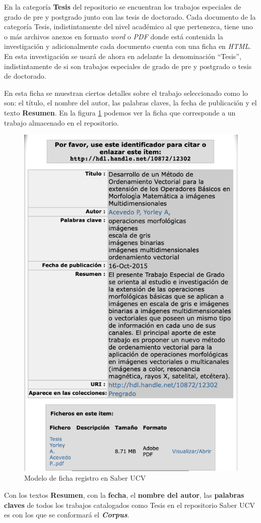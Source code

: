 \documentclass[
  10,
  spanish,
  openany]{book}
\begin{document}
En la categoría \textbf{Tesis} del repositorio se encuentran los trabajos especiales de grado de pre y postgrado junto con las tesis de doctorado. Cada documento de la categoría Tesis, indistintamente del nivel académico al que pertenezca, tiene uno o más archivos anexos en formato \emph{word} o \emph{PDF} donde está contenida la investigación y adicionalmente cada documento cuenta con una ficha en \emph{HTML}. En esta investigación se usará de ahora en adelante la denominación ``Tesis'', indistintamente de si son trabajos especiales de grado de pre y postgrado o tesis de doctorado.

En esta ficha se muestran ciertos detalles sobre el trabajo seleccionado como lo son: el título, el nombre del autor, las palabras claves, la fecha de publicación y el texto \textbf{Resumen}. En la figura \ref{fig:ficharegistro} podemos ver la ficha que corresponde a un trabajo almacenado en el repositorio.

\begin{figure}

{\centering \includegraphics[width=0.6\linewidth]{images/01-intro/ficha_registro} 

}

\caption{Modelo de ficha registro en Saber UCV}\label{fig:ficharegistro}
\end{figure}

Con los textos \textbf{Resumen}, con la \textbf{fecha}, el \textbf{nombre del autor}, las \textbf{palabras claves} de todos los trabajos catalogados como Tesis en el repositorio Saber UCV es con los que se conformará el \textbf{\emph{Corpus}}.
\end{document}
